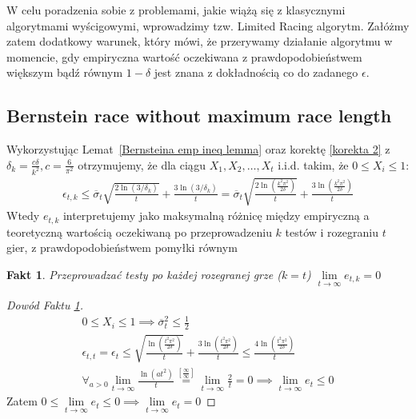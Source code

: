 \documentclass[inzynierska]{pwr_wmat_praca_dyplomowa}
\theoremstyle{plain}
\numberwithin{theorem}{chapter}
\newtheorem{fact}[theorem]{Fakt}
\theoremstyle{definition}
\numberwithin{theorem}{chapter}
\begin{document}
	W celu poradzenia sobie z problemami, jakie wiążą się z klasycznymi algorytmami wyścigowymi, wprowadzimy  tzw. Limited Racing algorytm. Załóżmy zatem dodatkowy warunek, który mówi, że przerywamy działanie algorytmu w momencie, gdy empiryczna wartość oczekiwana z prawdopodobieństwem większym bądź równym $1-\delta$ jest znana z dokładnością co do zadanego $\epsilon$.
	\subsection{Bernstein race without maximum race length}
	Wykorzystując Lemat~\ref{Bernsteina emp ineq lemma} oraz korektę \ref{korekta 2} z $\delta_k=\frac{c\delta}{k^2}, c=\frac{6}{\pi^2}$ otrzymujemy, że dla ciągu $X_1,X_2,\dots,X_t$ i.i.d. takim, że  $0 \le X_i \le 1$:
	\begin{align*}
		\label{Bernstein race without maximum race length}
		\epsilon_{t,k} \le \overline{\sigma}_t \sqrt{\frac{2\ln(3/\delta_k)}{t}} + \frac{3  \ln{(3 / \delta_k)}}{t} =
		\overline{\sigma}_t\sqrt{\frac{2\ln(\frac{k^2\pi^2}{2\delta})}{t}} + \frac{3  \ln{(\frac{k^2\pi^2}{2\delta})}}{t}
	\end{align*}
	Wtedy $e_{t,k}$ interpretujemy jako maksymalną różnicę między empiryczną a teoretyczną wartością oczekiwaną po przeprowadzeniu $k$ testów i rozegraniu $t$ gier, z prawdopodobieństwem pomyłki równym 
	\begin{fact}
		\label{Fakt Bernstein race without maximum race length}
		Przeprowadzać testy po każdej rozegranej grze ($k=t$)  $\lim\limits_{t\to\infty} e_{t,k} = 0$ 
	\end{fact}

	\begin{proof}[Dowód Faktu \ref{Fakt Bernstein race without maximum race length}]
		\begin{gather*}
		0\le X_i \le 1 \implies \overline{\sigma}_t^2 \le \frac{1}{2}\\
		\epsilon_{t,t} =\epsilon_t \le  \sqrt{\frac{\ln(\frac{t^2\pi^2}{2\delta})}{t}} + \frac{3  \ln{(\frac{t^2\pi^2}{2\delta})}}{t} \le \frac{4  \ln{(\frac{t^2\pi^2}{2\delta})}}{t}\\
		\forall_{a>0} \lim\limits_{t\to\infty} \frac{\ln(at^2)}{t} \overset{\left[\frac{\infty}{\infty}\right]}{=}\lim\limits_{t\to\infty} \frac{2}{t}=0 \implies
		\lim\limits_{t\to\infty} e_t \le 0 
		\end{gather*}
	Zatem $0\le \lim\limits_{t\to\infty} e_t \le 0 \implies \lim\limits_{t\to\infty} e_t = 0$
	\end{proof}
	
\end{document}
